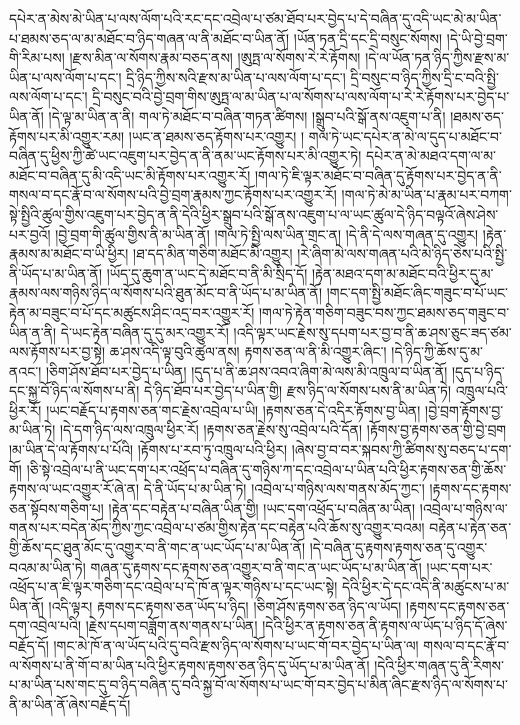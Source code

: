 དཔེར་ན་མེས་མེ་ཡིན་པ་ལས་ལོག་པའི་རང་དང་འབྲེལ་པ་ཙམ་ཐོབ་པར་བྱེད་པ་དེ་བཞིན་དུ་འདི་ཡང་མེ་མ་ཡིན་པ་ཐམས་ཅད་ལ་མ་མཐོང་བ་ཉིད་གཞན་ལ་ནི་མཐོང་བ་ཡིན་ནོ། །ཡོན་ཏན་དྲི་དང་དྲི་བསུང་སོགས། །དེ་ཡི་བྱེ་བྲག་གི་རིམ་པས། །རྫས་མིན་ལ་སོགས་རྣམ་བཅད་ནས། །ཨུཏྤ་ལ་སོགས་རེ་རེ་རྟོགས། །དེ་ལ་ཡོན་ཏན་ཉིད་ཀྱིས་རྫས་མ་ཡིན་པ་ལས་ལོག་པ་དང་། དྲི་ཉིད་ཀྱིས་སའི་རྫས་མ་ཡིན་པ་ལས་ལོག་པ་དང་། དྲི་བསུང་བ་ཉིད་ཀྱིས་དྲི་ང་བའི་སྤྱི་ལས་ལོག་པ་དང་། དྲི་བསུང་བའི་བྱེ་བྲག་གིས་ཨུཏྤ་ལ་མ་ཡིན་པ་ལ་སོགས་པ་ལས་ལོག་པ་རེ་རེ་རྟོགས་པར་བྱེད་པ་ཡིན་ནོ། །དེ་ལྟ་མ་ཡིན་ན་ནི། གལ་ཏེ་མཐོང་བ་བཞིན་གཏན་ཚིགས། །སྒྲུབ་པའི་སྒོ་ནས་འཇུག་པ་ནི། །ཐམས་ཅད་རྟོགས་པར་མི་འགྱུར་རམ། །ཡང་ན་ཐམས་ཅད་རྟོགས་པར་འགྱུར། །
གལ་ཏེ་ཡང་དཔེར་ན་མེ་ལ་དུད་པ་མཐོང་བ་བཞིན་དུ་ཕྱིས་ཀྱི་ཚེ་ཡང་འཇུག་པར་བྱེད་ན་ནི་ནམ་ཡང་རྟོགས་པར་མི་འགྱུར་ཏེ། དཔེར་ན་མེ་མཐའ་དག་ལ་མ་མཐོང་བ་བཞིན་དུ་མི་འདི་ཡང་མི་རྟོགས་པར་འགྱུར་རོ། །གལ་ཏེ་ཇི་ལྟར་མཐོང་བ་བཞིན་དུ་རྟོགས་པར་བྱེད་ན་ནི་གསལ་བ་དང་རྣོ་བ་ལ་སོགས་པའི་བྱེ་བྲག་རྣམས་ཀྱང་རྟོགས་པར་འགྱུར་རོ། །གལ་ཏེ་མེ་མ་ཡིན་པ་རྣམ་པར་བཀག་སྟེ་སྤྱིའི་ཚུལ་གྱིས་འཇུག་པར་བྱེད་ན་ནི་དེའི་ཕྱིར་སྒྲུབ་པའི་སྒོ་ནས་འཇུག་པ་ལ་ཡང་ཚུལ་དེ་ཉིད་བལྟའོ་ཞེས་ཤེས་པར་བྱའོ། །བྱེ་བྲག་གི་ཚུལ་གྱིས་ནི་མ་ཡིན་ནོ། །གལ་ཏེ་སྤྱི་ལས་ཡིན་གྲང་ན། །དེ་ནི་དེ་ལས་གཞན་དུ་འགྱུར། །རྟེན་རྣམས་མ་མཐོང་བ་ཡི་ཕྱིར། །ཐ་དད་མིན་གཅིག་མཐོང་མི་འགྱུར། །རེ་ཞིག་མེ་ལས་གཞན་པའི་མེ་ཉིད་ཅེས་པའི་སྤྱི་ནི་ཡོད་པ་མ་ཡིན་ནོ། །ཡོད་དུ་ཆུག་ན་ཡང་དེ་མཐོང་བ་ནི་མི་སྲིད་དོ། །རྟེན་མཐའ་དག་མ་མཐོང་བའི་ཕྱིར་དུ་མ་རྣམས་ལས་གཉིས་ཉིད་ལ་སོགས་པའི་ཐུན་མོང་བ་ནི་ཡོད་པ་མ་ཡིན་ནོ། །གང་དག་སྤྱི་མཐོང་ཞིང་གཟུང་བ་པོ་ཡང་རྟེན་མ་བཟུང་བ་པོ་དང་མཚུངས་ཤིང་འདྲ་བར་འགྱུར་རོ། །གལ་ཏེ་རྟེན་གཅིག་བཟུང་བས་ཀྱང་ཐམས་ཅད་གཟུང་བ་ཡིན་ན་ནི། དེ་ཡང་རྟེན་བཞིན་དུ་དུ་མར་འགྱུར་རོ། །འདི་ལྟར་ཡང་རྗེས་སུ་དཔག་པར་བྱ་བ་ནི་ཆ་ཤས་ཅུང་ཟད་ཙམ་ལས་རྟོགས་པར་བྱ་སྟེ། ཆ་ཤས་འདི་ལྟ་བུའི་ཚུལ་ནས། རྟགས་ཅན་ལ་ནི་མི་འགྱུར་ཞིང་། །དེ་ཉིད་ཀྱི་ཆོས་དུ་མ་ནའང་། །ཅིག་ཤོས་ཐོབ་པར་བྱེད་པ་ཡིན། །དུད་པ་ནི་ཆ་ཤས་འབའ་ཞིག་མེ་ལས་མི་འཁྲུལ་བ་ཡིན་ནོ། །དུད་པ་ཉིད་དང་སྐྱ་བོ་ཉིད་ལ་སོགས་པ་ནི། དེ་ཉིད་ཐོབ་པར་བྱེད་པ་ཡིན་གྱི། རྫས་ཉིད་ལ་སོགས་པས་ནི་མ་ཡིན་ཏེ། འཁྲུལ་པའི་ཕྱིར་རོ། །ཡང་བརྗོད་པ་རྟགས་ཅན་གང་རྗེས་འབྲེལ་པ་ཡི། །རྟགས་ཅན་དེ་འདིར་རྟོགས་བྱ་ཡིན། །བྱེ་བྲག་རྟོགས་བྱ་མ་ཡིན་ཏེ། །དེ་དག་ཉིད་ལས་འཁྲུལ་ཕྱིར་རོ། །རྟགས་ཅན་རྗེས་སུ་འབྲེལ་པའི་དོན། །རྟོགས་བྱ་རྟགས་ཅན་གྱི་བྱེ་བྲག །མ་ཡིན་དེ་ལ་རྟོགས་པ་པོའི། །རྟོགས་པ་རབ་ཏུ་འཁྲུལ་པའི་ཕྱིར། །ཞེས་བྱ་བ་བར་སྐབས་ཀྱི་ཚིགས་སུ་བཅད་པ་དག་གོ། །ཅི་སྟེ་འབྲེལ་པ་ནི་ཡང་དག་པར་འཕྲོད་པ་བཞིན་དུ་གཉིས་ཀ་དང་འབྲེལ་པ་ཡིན་པའི་ཕྱིར་རྟགས་ཅན་གྱི་ཆོས་རྟགས་ལ་ཡང་འགྱུར་རོ་ཞེ་ན། དེ་ནི་ཡོད་པ་མ་ཡིན་ཏེ། །འབྲེལ་པ་གཉིས་ལས་གནས་མོད་ཀྱང་། །རྟགས་དང་རྟགས་ཅན་སྟོབས་གཅིག་པ། །རྟེན་དང་བརྟེན་པ་བཞིན་ཡིན་གྱི། །ཡང་དག་འཕྲོད་པ་བཞིན་མ་ཡིན། །འབྲེལ་པ་གཉིས་ལ་གནས་པར་བདེན་མོད་ཀྱིས་ཀྱང་འབྲེལ་པ་ཙམ་གྱིས་རྟེན་དང་བརྟེན་པའི་ཆོས་སུ་འགྱུར་བའམ། བརྟེན་པ་རྟེན་ཅན་གྱི་ཆོས་དང་ཐུན་མོང་དུ་འགྱུར་བ་ནི་གང་ན་ཡང་ཡོད་པ་མ་ཡིན་ནོ། །དེ་བཞིན་དུ་རྟགས་རྟགས་ཅན་དུ་འགྱུར་བའམ་མ་ཡིན་ཏེ། གཞན་དུ་རྟགས་དང་རྟགས་ཅན་འགྱུར་བ་ནི་གང་ན་ཡང་ཡོད་པ་མ་ཡིན་ནོ། །ཡང་དག་པར་འཕྲོད་པ་ན་ཇི་ལྟར་གཅིག་དང་འབྲེལ་པ་དེ་ཁོ་ན་ལྟར་གཉིས་པ་དང་ཡང་སྟེ། དེའི་ཕྱིར་དེ་དང་འདི་ནི་མཚུངས་པ་མ་ཡིན་ནོ། །འདི་ལྟར། རྟགས་དང་རྟགས་ཅན་ཡོད་པ་ཉིད། །ཅིག་ཤོས་རྟགས་ཅན་ཉིད་ལ་ཡོད། །རྟགས་དང་རྟགས་ཅན་དག་འབྲེལ་པའི། །རྗེས་དཔག་བཟློག་ནས་གནས་པ་ཡིན། །དེའི་ཕྱིར་ན་རྟགས་ཅན་ནི་རྟགས་ལ་ཡོད་པ་ཉིད་དོ་ཞེས་བརྗོད་དོ། །གང་མེ་ཁོ་ན་ལ་ཡོད་པའི་དུ་བའི་རྫས་ཉིད་ལ་སོགས་པ་ཡང་གོ་བར་བྱེད་པ་ཡིན་ལ། གསལ་བ་དང་རྣོ་བ་ལ་སོགས་པ་ནི་གོ་བ་མ་ཡིན་པའི་ཕྱིར་རྟགས་རྟགས་ཅན་ཉིད་དུ་ཡོད་པ་མ་ཡིན་ནོ། །དེའི་ཕྱིར་གཞན་དུ་ནི་རིགས་པ་མ་ཡིན་པས་གང་དུ་བ་ཉིད་བཞིན་དུ་བའི་སྐྱ་བོ་ལ་སོགས་པ་ཡང་གོ་བར་བྱེད་པ་མིན་ཞིང་རྫས་ཉིད་ལ་སོགས་པ་ནི་མ་ཡིན་ནོ་ཞེས་བརྗོད་དོ། 